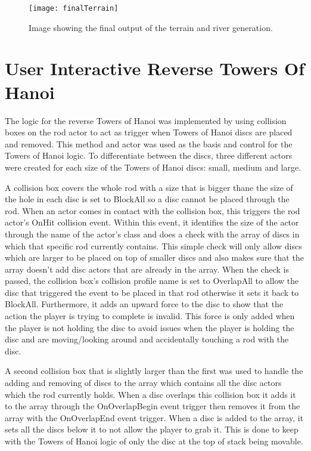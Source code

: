 \begin{figure}[H]
	\texttt{[image: finalTerrain]}
	\centering
	\caption{Image showing the final output of the terrain and river generation.}
	\label{fig:finalTerrain}
\end{figure}


\section{User Interactive Reverse Towers Of Hanoi}
The logic for the reverse Towers of Hanoi was implemented by using collision boxes on the rod actor to act as trigger when Towers of Hanoi discs are placed and removed. This method and actor was used as the basis and control for the Towers of Hanoi logic. To differentiate between the discs, three different actors were created for each size of the Towers of Hanoi discs: small, medium and large. 
\newline
\par
A collision box covers the whole rod with a size that is bigger thane the size of the hole in each disc is set to BlockAll so a disc cannot be placed through the rod. When an actor comes in contact with the collision box, this triggers the rod actor's OnHit collision event. Within this event, it identifies the size of the actor through the name of the actor's class and does a check with the array of discs in which that specific rod currently contains. This simple check will only allow discs which are larger to be placed on top of smaller discs and also makes sure that the array doesn't add disc actors that are already in the array. When the check is passed, the collision box's collision profile name is set to OverlapAll to allow the disc that triggered the event to be placed in that rod otherwise it sets it back to BlockAll. Furthermore, it adds an upward force to the disc to show that the action the player is trying to complete is invalid. This force is only added when the player is not holding the disc to avoid issues when the player is holding the disc and are moving/looking around and accidentally touching a rod with the disc.
\newline
\par
A second collision box that is slightly larger than the first was used to handle the adding and removing of discs to the array which contains all the disc actors which the rod currently holds. When a disc overlaps this collision box it adds it to the array through the OnOverlapBegin event trigger then removes it from the array with the OnOverlapEnd event trigger. When a disc is added to the array, it sets all the discs below it to not allow the player to grab it. This is done to keep with the Towers of Hanoi logic of only the disc at the top of stack being movable.
